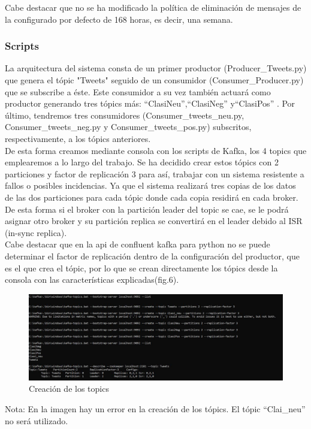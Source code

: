 \documentclass[12pt, a4paper, twoside]{article}
\newcommand{\quotes}[1]{``#1''}
\begin{document}
Cabe destacar que no se ha modificado la política de eliminación de mensajes de la configurado por defecto de 168 horas, es decir, una semana.
\newpage
\subsubsection{Scripts}

La arquitectura del sistema consta de un primer productor (Producer\_Tweets.py) que genera el tópic "Tweets" seguido de un consumidor (Consumer\_Producer.py) que se subscribe a éste.  Este consumidor a su vez también actuará como productor generando tres tópics más: \quotes{ClasiNeu},\quotes{ClasiNeg}  y\quotes{ClasiPos} . Por último, tendremos tres consumidores (Consumer\_tweets\_neu.py, Consumer\_tweets\_neg.py y Consumer\_tweets\_pos.py) subscritos, respectivamente, a los tópics anteriores.\\
 De esta forma creamos mediante consola con los scripts de Kafka, los 4 topics que emplearemos a lo largo del trabajo. Se ha decidido crear estos tópics con 2 particiones y factor de replicación 3 para así, trabajar con un sistema resistente a fallos o posibles incidencias.
Ya que el sistema realizará tres copias de los datos de las dos particiones para cada tópic donde cada copia residirá en cada broker. 
De esta forma si el broker con la partición leader del topic se cae, se le podrá asignar otro broker y su partición replica se convertirá en el leader debido al ISR (in-sync replica).\\
Cabe destacar que en la api de confluent kafka para python no se puede determinar el factor de replicación dentro de la configuración del productor, que es el que crea el tópic, por lo que se crean directamente los tópics desde la consola con las características explicadas(fig.6).





\begin{figure}[h]
		\centering
		\includegraphics[width=1.1\linewidth]{topic_creation}
		\caption{Creación de los topics}
\end{figure}
Nota: En la imagen hay un error en la creación de los tópics. El tópic \quotes{Clai\_neu} no será utilizado.
\end{document}
